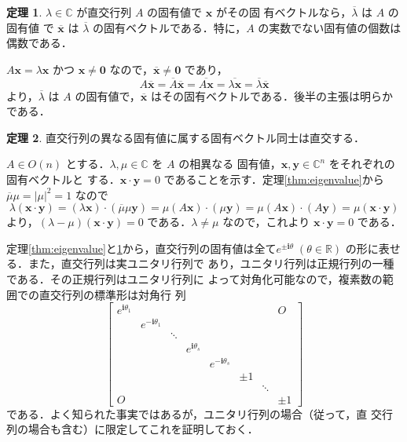 \documentclass[11pt, uplatex, dvipdfmx, titlepage]{jsarticle}
\makeatletter
\renewcommand{\i}{\mathbf{i}}
\renewcommand{\bar}[1]{\overline{#1}}
\renewenvironment{proof}[1][\proofname]{\par
  \pushQED{\qed}%
  \normalfont \topsep6\p@\@plus6\p@\relax
  \trivlist
  \item[\hskip\labelsep
         \bfseries
    {#1}]\ignorespaces
}{%
  \popQED\endtrivlist\@endpefalse
}
\theoremstyle{definition}
\newtheorem{theorem}{定理}[section]
\renewcommand{\proofname}{\textbf{証明}}
\makeatother
\begin{document}
\begin{theorem}\label{thm:eigen-conj}
  $\lambda \in \mathbb{C}$ が直交行列 $A$ の固有値で $\bm{x}$ がその固
  有ベクトルなら，$\bar{\lambda}$ は $A$ の固有値
  で $\bar{\bm{x}}$ は $\bar{\lambda}$ の固有ベクトルである．特に，$A$
  の実数でない固有値の個数は偶数である．
\end{theorem}

\begin{proof}
  $A\bm{x} = \lambda \bm{x}$ かつ $\bm{x} \neq \bm{0}$ なので，$\bar{\bm{x}} \neq \bm{0}$ であり，
  \[
    A \bar{\bm{x}} = \bar{A}\bar{\bm{x}} = \bar{A\bm{x}} = \bar{\lambda \bm{x}} = \bar{\lambda} \bar{\bm{x}}
  \]
  より，$\bar{\lambda}$ は $A$ の固有値で，$\bar{\bm{x}}$ はその固有ベクトルである．後半の主張は明らかである．
\end{proof}

\begin{theorem}\label{thm:eigen-perp}
  直交行列の異なる固有値に属する固有ベクトル同士は直交する．
\end{theorem}

\begin{proof}
  $A \in O(n)$ とする．$\lambda, \mu \in \mathbb{C}$ を $A$ の相異なる
  固有値，$\bm{x}, \bm{y} \in \mathbb{C}^n$ をそれぞれの固有ベクトルと
  する．$\bm{x}\cdot \bm{y}=0$
  であることを示す．定理\ref{thm:eigenvalue}から $\bar{\mu}\mu= |\mu|^2=1$ なので
  \[
    \lambda(\bm{x}\cdot \bm{y}) = (\lambda \bm{x})\cdot (\bar{\mu}\mu
    \bm{y}) = \mu\left(A\bm{x}\right) \cdot \left( \mu
        \bm{y}\right) = \mu \left(A\bm{x}\right)\cdot
      \left(A\bm{y}\right) = \mu (\bm{x} \cdot \bm{y})
  \]
  より，$(\lambda - \mu)(\bm{x}\cdot \bm{y})=0$ である．$\lambda \neq \mu$ なので，これより $\bm{x}\cdot \bm{y}=0$ である．
\end{proof}

定理\ref{thm:eigenvalue}と\ref{thm:eigen-conj}から，直交行列の固有値は全て$e^{\pm \i \theta} \;
(\theta \in \mathbb{R})$ の形に表せる．また，直交行列は実ユニタリ行列で
あり，ユニタリ行列は正規行列の一種である．その正規行列はユニタリ行列に
よって対角化可能なので，複素数の範囲での直交行列の標準形は対角行
列
\begin{equation}\label{eq:diag}
\left[
  \begin{array}{cccccccc}
    e^{\i\theta_1} & & & & & & & O\\
                           & e^{-\i\theta_1} & & & & & &\\
                           & & \ddots & & & & &\\
                           & & & e^{\i\theta_s} & & & &\\
                           & & & & e^{-\i\theta_s} & & &\\
                           & & & & & \pm 1 & &\\
                           & & & & & & \ddots & \\
    O & & & & & & & \pm 1
  \end{array}
\right]
\end{equation}
である．よく知られた事実ではあるが，ユニタリ行列の場合（従って，直
交行列の場合も含む）に限定してこれを証明しておく．
\end{document}
